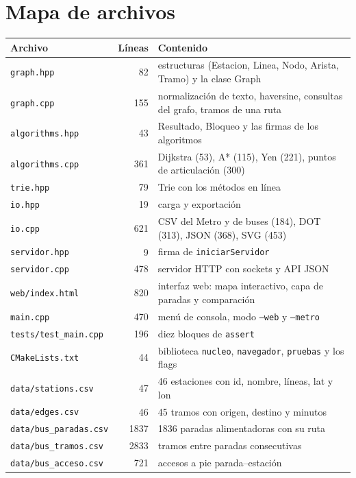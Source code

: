 \documentclass[11pt,a4paper]{article}
\newcommand{\arch}[1]{\texttt{#1}}
\begin{document}
\section{Mapa de archivos}
\label{anexo:mapa}

\begin{center}
\footnotesize
\begin{tabular}{lrp{8.4cm}}
\toprule
Archivo & Líneas & Contenido \\
\midrule
\arch{graph.hpp}      &  82 & estructuras (Estacion, Linea, Nodo, Arista, Tramo) y la clase Graph \\
\arch{graph.cpp}      & 155 & normalización de texto, haversine, consultas del grafo, tramos de una ruta \\
\arch{algorithms.hpp} &  43 & Resultado, Bloqueo y las firmas de los algoritmos \\
\arch{algorithms.cpp} & 361 & Dijkstra (53), A* (115), Yen (221), puntos de articulación (300) \\
\arch{trie.hpp}       &  79 & Trie con los métodos en línea \\
\arch{io.hpp}         &  19 & carga y exportación \\
\arch{io.cpp}         & 621 & CSV del Metro y de buses (184), DOT (313), JSON (368), SVG (453) \\
\arch{servidor.hpp}   &   9 & firma de \arch{iniciarServidor} \\
\arch{servidor.cpp}   & 478 & servidor HTTP con sockets y API JSON \\
\arch{web/index.html} & 820 & interfaz web: mapa interactivo, capa de paradas y comparación \\
\arch{main.cpp}       & 470 & menú de consola, modo \arch{--web} y \arch{--metro} \\
\arch{tests/test\_main.cpp} & 196 & diez bloques de \arch{assert} \\
\arch{CMakeLists.txt} &  44 & biblioteca \arch{nucleo}, \arch{navegador}, \arch{pruebas} y los flags \\
\arch{data/stations.csv} & 47 & 46 estaciones con id, nombre, líneas, lat y lon \\
\arch{data/edges.csv}    & 46 & 45 tramos con origen, destino y minutos \\
\arch{data/bus\_paradas.csv} & 1837 & 1836 paradas alimentadoras con su ruta \\
\arch{data/bus\_tramos.csv}  & 2833 & tramos entre paradas consecutivas \\
\arch{data/bus\_acceso.csv}  & 721 & accesos a pie parada--estación \\

\end{tabular}
\end{center}
\end{document}
